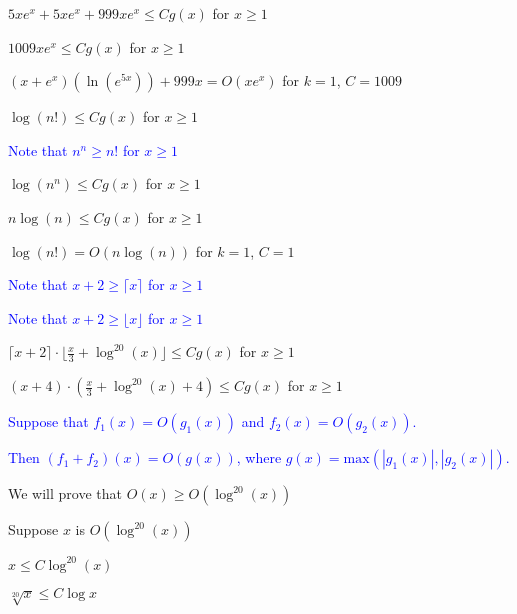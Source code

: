 \documentclass{exam}
\begin{document}
\begin{questions}
\begin{subparts}
\begin{center}
\( 5xe^x + 5xe^x + 999xe^x \leq Cg(x) \) for \(x \geq 1\)

\( 1009xe^x \leq Cg(x) \) for \(x \geq 1\)

\( (x + e^x)(\ln(e^{5x})) + 999x = O(xe^x)\) for \(k = 1\), \(C = 1009\)
\end{center}


\begin{center}

\(\log(n!) \leq Cg(x)\) for \(x \geq 1\)
\vspace{5px}

\textcolor{blue}{Note that \(n^n \geq n!\) for \(x \geq 1\)}
\vspace{5px}

\(\log(n^n) \leq Cg(x)\) for \(x \geq 1\)

\(n\log(n) \leq Cg(x)\) for \(x \geq 1\)

\(\log(n!) = O(n\log(n))\) for \(k = 1\), \(C = 1\)

\end{center}

\newpage


\begin{center}
\textcolor{blue}{Note that \( x+2 \geq \lceil x \rceil\) for \(x \geq 1\)}

\textcolor{blue}{Note that \( x+2 \geq \lfloor x \rfloor\) for \(x \geq 1\)}
\vspace{5px}

\( \lceil x + 2 \rceil \cdot \lfloor \frac{x}{3} + \log^{20}(x) \rfloor \leq Cg(x)\) for \(x \geq 1\)

\( (x + 4) \cdot (\frac{x}{3} + \log^{20}(x) + 4) \leq Cg(x)\) for \(x \geq 1\)

\vspace{5px}
\textcolor{blue}{Suppose that \(f_1(x) = O(g_1(x))\) and \(f_2(x) = O(g_2(x))\).}

\textcolor{blue}{Then \((f_1 + f_2)(x) = O(g(x))\), where \(g(x) = \text{max}(|g_1(x)|, |g_2(x)|)\).}
\vspace{5px}

We will prove that \(O(x) \geq O(\log^{20}(x))\)

Suppose \(x\) is \(O(\log^{20}(x))\)

\(x \leq C\log^{20}(x)\)

\(\sqrt[20]{x} \leq C\log{x}\)


\end{center}
\end{subparts}
\end{questions}
\end{document}
